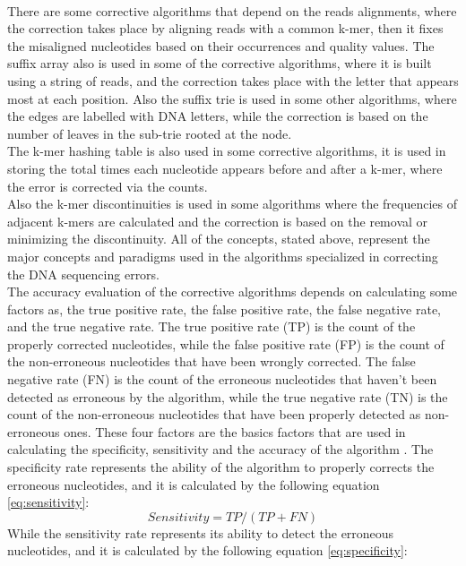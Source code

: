\documentclass[12pt,openany]{llncs}
\begin{document}
\\
There are some corrective algorithms that depend on the reads alignments, where the correction takes place by aligning reads with a common k-mer, then it fixes the misaligned nucleotides based on their occurrences and quality values.
The suffix array also is used in some of the corrective algorithms, where it is built using a string of reads, and the correction takes place with the letter that appears most at each position. Also the suffix trie is used in some other algorithms, where the edges are labelled with DNA letters, while the correction is based on the number of leaves in the sub-trie rooted at the node.
\\
The k-mer hashing table is also used in some corrective algorithms, it is used in storing the total times each nucleotide appears before and after a k-mer, where the error is corrected via the counts. 
\\
Also the k-mer discontinuities is used in some algorithms where the frequencies of adjacent k-mers are calculated and the correction is based on the removal or minimizing the discontinuity.
All of the concepts, stated above, represent the major concepts and paradigms used in the algorithms specialized in correcting the DNA sequencing errors.
\\
The accuracy evaluation of the corrective algorithms depends on calculating some factors as, the true positive rate, the false positive rate, the false negative rate, and the true negative rate. The true positive rate (TP) is the count of the properly corrected nucleotides, while the false positive rate (FP) is the count of the non-erroneous nucleotides that have been wrongly corrected. The false negative rate (FN) is the count of the erroneous nucleotides that haven't been detected as erroneous by the algorithm, while the true negative rate (TN) is the count of the non-erroneous nucleotides that have been properly detected as non-erroneous ones. These four factors are the basics factors that are used in calculating the specificity, sensitivity and the accuracy of the algorithm \cite{analysis}. The specificity rate represents the ability of the algorithm to properly corrects the erroneous nucleotides, and it is calculated by the following equation \ref{eq:sensitivity}:
\begin{equation} \label{eq:sensitivity}
  Sensitivity = TP/(TP+FN) 
\end{equation}
While the sensitivity rate represents its ability to detect the erroneous nucleotides, and it is calculated by the following equation \ref{eq:specificity}: 
\end{document}
